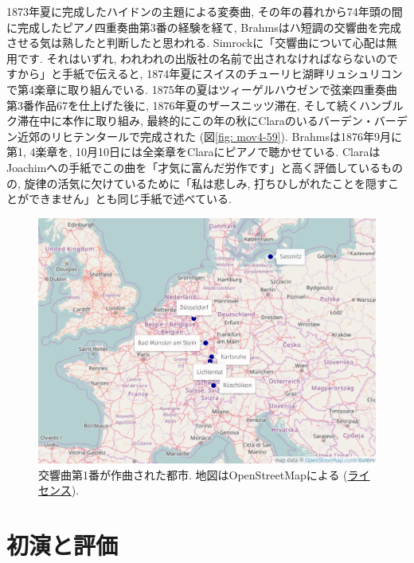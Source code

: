 1873年夏に完成したハイドンの主題による変奏曲, その年の暮れから74年頭の間に完成したピアノ四重奏曲第3番の経験を経て, Brahmsはハ短調の交響曲を完成させる気は熟したと判断したと思われる.
Simrockに「交響曲について心配は無用です. それはいずれ, われわれの出版社の名前で出されなければならないのですから」と手紙で伝える\cite{ogt}と,
1874年夏にスイスのチューリヒ湖畔リュシュリコンで第4楽章に取り組んでいる.
1875年の夏はツィーゲルハウゼンで弦楽四重奏曲第3番作品67を仕上げた\cite{compos}後に, 1876年夏のザースニッツ滞在,
そして続くハンブルク滞在中に本作に取り組み, 最終的にこの年の秋にClaraのいるバーデン・バーデン近郊のリヒテンタールで完成された (図\ref{fig: mov4-59}).
Brahmsは1876年9月に第1, 4楽章を, 10月10日には全楽章をClaraにピアノで聴かせている.
ClaraはJoachimへの手紙でこの曲を「才気に富んだ労作です」と高く評価しているものの, 旋律の活気に欠けているために「私は悲しみ,
打ちひしがれたことを隠すことができません」とも同じ手紙で述べている\cite{compos}.

\begin{figure}[htbp]
	\begin{center}
    \includegraphics[clip,width=12.0cm]{./figure/map-composition.png}
	\caption{交響曲第1番が作曲された都市.
		地図はOpenStreetMapによる (\href{http://www.openstreetmap.org/copyright}{ライセンス}).}
    \label{fig: concert}
	\end{center}
\end{figure}


\section{初演と評価}\label{sec: premiere}

